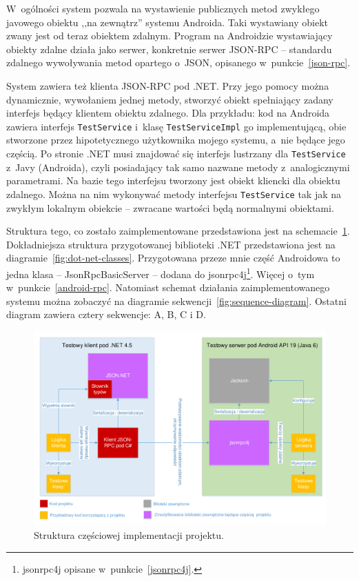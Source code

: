 W~ogólności system pozwala na wystawienie publicznych metod zwykłego javowego obiektu ,,na zewnątrz'' systemu Androida.
Taki wystawiany obiekt zwany jest od teraz obiektem zdalnym.
Program na Androidzie wystawiający obiekty zdalne działa jako serwer, konkretnie serwer JSON-RPC -- standardu zdalnego wywoływania metod opartego o~JSON, opisanego w~punkcie~\ref{json-rpc}.

System zawiera też klienta JSON-RPC pod .NET. Przy jego pomocy można dynamicznie, wywołaniem jednej metody, stworzyć obiekt spełniający zadany interfejs będący klientem obiektu zdalnego.
Dla przykładu: kod na Androida zawiera interfejs \texttt{TestService} i~klasę \texttt{TestServiceImpl} go implementującą, obie stworzone przez hipotetycznego użytkownika mojego systemu, a~nie będące jego częścią.
Po stronie .NET musi znajdować się interfejs lustrzany dla \texttt{TestService} z~Javy (Androida), czyli posiadający tak samo nazwane metody z~analogicznymi parametrami.
Na bazie tego interfejsu tworzony jest obiekt kliencki dla obiektu zdalnego. Można na nim wykonywać metody interfejsu \texttt{TestService} tak jak na zwykłym lokalnym obiekcie -- zwracane wartości będą normalnymi obiektami.

Struktura tego, co zostało zaimplementowane przedstawiona jest na schemacie~\ref{fig:implementation-overview}.
Dokładniejsza struktura przygotowanej biblioteki .NET przedstawiona jest na diagramie~\ref{fig:dot-net-classes}.
Przygotowana przeze mnie część Androidowa to jedna klasa -- JsonRpcBasicServer -- dodana do jsonrpc4j\footnote{jsonrpc4j opisane w~punkcie~\ref{jsonrpc4j}.}. Więcej o~tym w~punkcie~\ref{android-rpc}.
Natomiast schemat działania zaimplementowanego systemu można zobaczyć na diagramie sekwencji~\ref{fig:sequence-diagram}.
Ostatni diagram zawiera cztery sekwencje: A, B, C i D.
\begin{figure}
	\centering
		\includegraphics[width=\textwidth]{img/schematy/schemat-implementacji.pdf}
	\caption{Struktura częściowej implementacji projektu.}
	\label{fig:implementation-overview}
\end{figure}

